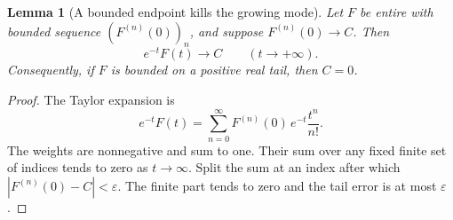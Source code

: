\documentclass[11pt,reqno]{amsart}
\numberwithin{equation}{section}
\newtheorem{lemma}[theorem]{Lemma}
\theoremstyle{definition}
\theoremstyle{remark}
\begin{document}
\begin{lemma}[A bounded endpoint kills the growing mode]\label{lem:poisson}
Let $F$ be entire with bounded sequence $(F^{(n)}(0))_n$, and suppose $F^{(n)}(0)\to C$. Then
\[
 e^{-t}F(t)\longrightarrow C\qquad(t\to+\infty).
\]
Consequently, if $F$ is bounded on a positive real tail, then $C=0$.
\end{lemma}
\begin{proof}
The Taylor expansion is
\[
 e^{-t}F(t)=\sum_{n=0}^{\infty}F^{(n)}(0)\,e^{-t}\frac{t^n}{n!}.
\]
The weights are nonnegative and sum to one. Their sum over any fixed finite set of indices tends to zero as $t\to\infty$. Split the sum at an index after which $|F^{(n)}(0)-C|<\varepsilon$. The finite part tends to zero and the tail error is at most $\varepsilon$.
\end{proof}
\end{document}

